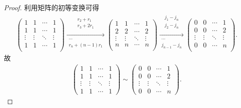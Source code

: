 \documentclass[../../main.tex]{subfiles}%
\begin{document}
\begin{proof}

利用矩阵的初等变换可得
\begin{align*}
\left( \begin{matrix}
1&		1&		\cdots&		1\\
1&		1&		\cdots&		1\\
\vdots&		\vdots&		\ddots&		\vdots\\
1&		1&		\cdots&		1\\
\end{matrix} \right) \xrightarrow[\begin{array}{c}
\cdots\\
r_n+\left( n-1 \right) r_1\\
\end{array}]{\begin{array}{c}
r_2+r_1\\
r_3+2r_1\\
\end{array}}\left( \begin{matrix}
1&		1&		\cdots&		1\\
2&		2&		\cdots&		2\\
\vdots&		\vdots&		\ddots&		\vdots\\
n&		n&		\cdots&		n\\
\end{matrix} \right) \xrightarrow[\begin{array}{c}
\cdots\\
j_{n-1}-j_n\\
\end{array}]{\begin{array}{c}
j_1-j_n\\
j_2-j_n\\
\end{array}}\left( \begin{matrix}
0&		0&		\cdots&		1\\
0&		0&		\cdots&		2\\
\vdots&		\vdots&		\ddots&		\vdots\\
0&		0&		\cdots&		n\\
\end{matrix} \right) .
\end{align*}
故
\begin{align*}
\left( \begin{matrix}
1&1&\cdots&1\\
1&1&\cdots&1\\
\vdots&\vdots&\ddots&\vdots\\
1&1&\cdots&1
\end{matrix} \right) 
\sim
\left( \begin{matrix}
0&0&\cdots&1\\
0&0&\cdots&2\\
\vdots&\vdots&\ddots&\vdots\\
0&0&\cdots&n
\end{matrix} \right).
\end{align*} 

\end{proof}
\end{document}
